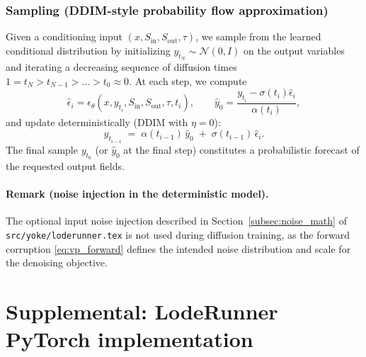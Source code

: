 \documentclass{article} %
\begin{document}
\subsubsection{Sampling (DDIM-style probability flow approximation)}
\label{subsec:sampling_ddim}

Given a conditioning input $(x,S_{\mathrm{in}},S_{\mathrm{out}},\tau)$, we sample from the learned conditional
distribution by initializing $y_{t_N}\sim\mathcal{N}(0,I)$ on the output variables and iterating a decreasing
sequence of diffusion times $1=t_N > t_{N-1} > \dots > t_0\approx 0$. At each step, we compute
\[
\widehat{\epsilon}_i = \epsilon_\theta(x,y_{t_i},S_{\mathrm{in}},S_{\mathrm{out}},\tau,t_i),
\qquad
\widehat{y}_0 = \frac{y_{t_i}-\sigma(t_i)\widehat{\epsilon}_i}{\alpha(t_i)},
\]
and update deterministically (DDIM with $\eta=0$):
\begin{equation}
y_{t_{i-1}}
\;=\;
\alpha(t_{i-1})\,\widehat{y}_0 \;+\; \sigma(t_{i-1})\,\widehat{\epsilon}_i.
\label{eq:ddim_update}
\end{equation}
The final sample $y_{t_0}$ (or $\widehat{y}_0$ at the final step) constitutes a probabilistic forecast of the
requested output fields.

\paragraph{Remark (noise injection in the deterministic model).}
The optional input noise injection described in Section~\ref{subsec:noise_math} of \texttt{src/yoke/loderunner.tex}
is not used during diffusion training, as the forward corruption \eqref{eq:vp_forward} defines the intended
noise distribution and scale for the denoising objective.




\appendix

%

\section{Supplemental: LodeRunner PyTorch implementation}

\end{document}
